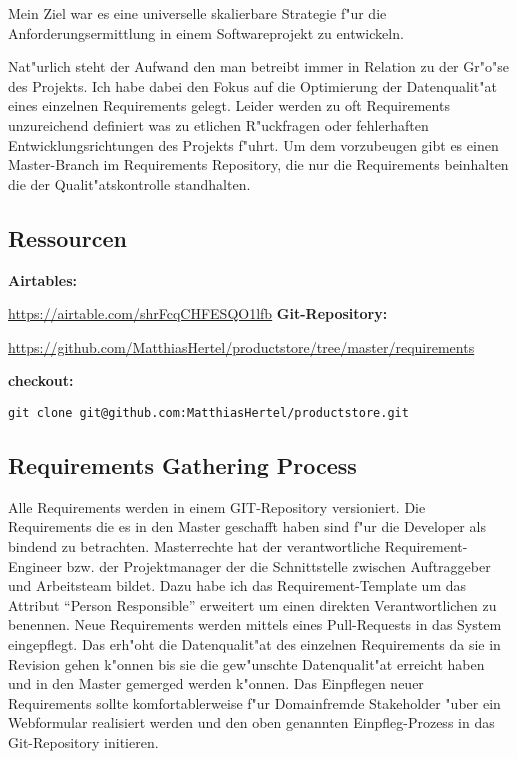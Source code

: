 \documentclass[12pt]{article}
\begin{document}
Mein Ziel war es eine universelle skalierbare Strategie f"ur die Anforderungsermittlung in einem Softwareprojekt zu entwickeln.

Nat"urlich steht der Aufwand den man betreibt immer in Relation zu der Gr"o"se des Projekts. Ich habe dabei den Fokus auf die Optimierung der Datenqualit"at eines einzelnen Requirements gelegt.
Leider werden zu oft Requirements unzureichend definiert was zu etlichen R"uckfragen oder fehlerhaften Entwicklungsrichtungen des Projekts f"uhrt.
Um dem vorzubeugen gibt es einen Master-Branch im Requirements Repository, die nur die Requirements beinhalten die der Qualit"atskontrolle standhalten.





\subsection{Ressourcen}
\textbf{Airtables:}

\url{https://airtable.com/shrFcqCHFESQO1lfb}
\bigbreak
\textbf{Git-Repository:}

\url{https://github.com/MatthiasHertel/productstore/tree/master/requirements}
\smallbreak

\textbf{checkout:}
\begin{lstlisting}
git clone git@github.com:MatthiasHertel/productstore.git
\end{lstlisting}
\newpage
\subsection{Requirements Gathering Process}

Alle Requirements werden in einem GIT-Repository versioniert.
Die Requirements die es in den Master geschafft haben sind f"ur die Developer als bindend zu betrachten.
Masterrechte hat der verantwortliche Requirement-Engineer bzw. der Projektmanager der die Schnittstelle zwischen Auftraggeber und Arbeitsteam bildet.
Dazu habe ich das Requirement-Template um das Attribut ``Person Responsible'' erweitert um einen direkten Verantwortlichen zu benennen.
\smallbreak
Neue Requirements werden mittels eines Pull-Requests in das System eingepflegt. Das erh"oht die Datenqualit"at des einzelnen Requirements da sie in Revision gehen k"onnen bis sie die gew"unschte Datenqualit"at erreicht haben und in den Master gemerged werden k"onnen.
\smallbreak
Das Einpflegen neuer Requirements sollte komfortablerweise f"ur Domainfremde Stakeholder "uber ein Webformular realisiert werden und den oben genannten Einpfleg-Prozess in das Git-Repository initieren.
\smallbreak
\end{document}
